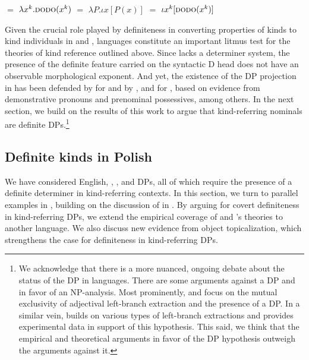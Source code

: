 \documentclass[output=paper]{langscibook}
\begin{document}
\ea \label{ex:deriv_borik}
\ea {} $=$ $\lambda x^k.\textsc{dodo}(x^k)$ \label{ex:deriv_borik_1}
\ex {} $=$ $\lambda P.\iota x[P(x)]$
\ex {} $=$ $\iota x^k[\textsc{dodo}(x^k)]$ \label{ex:deriv_borik_3}
\z \z

\noindent
Given the crucial role played by definiteness in converting properties of kinds to kind individuals in  and ,  languages constitute an important litmus test for the theories of kind reference outlined above. Since  lacks a determiner system, the presence of the definite feature carried on the syntactic D head does not have an observable morphological exponent. And yet, the existence of the DP projection in  has been defended by \cite{Pereltsvaig2007} for  and by \cite{Willim2000}, \cite{Migdalski2001} and \cite{Rutkowski2007} for , based on evidence from demonstrative pronouns and prenominal possessives, among others. In the next section, we build on the results of this work to argue that  kind-referring nominals are definite DPs.\footnote{\label{ftn:dp-hypothesis}We acknowledge that there is a more nuanced, ongoing debate about the status of the DP in  languages. There are some arguments against a DP and in favor of an NP-analysis. Most prominently, \citet{Boskovic2005} and \citet{Boskovic2007} focus on the mutual exclusivity of adjectival left-branch extraction and the presence of a DP. In a similar vein, \cite{Ceglowski2017} builds on various types of left-branch extractions and provides experimental data in support of this hypothesis. This said, we think that the empirical and theoretical arguments in favor of the DP hypothesis outweigh the arguments against it.}


\subsection{Definite kinds in Polish} \label{sec:def_kinds_pol}

We have considered English, , , and  DPs, all of which require the presence of a definite determiner in kind-referring contexts. In this section, we turn to parallel examples in , building on the discussion of  in \citet{Borik.Espinal2012, Borik.Espinal2016}. By arguing for covert definiteness in  kind-referring DPs, we extend the empirical coverage of  and \citeauthor{Borik.Espinal2012}'s theories to another language. We also discuss new evidence from object topicalization, which strengthens the case for definiteness in  kind-referring DPs.
\end{document}
